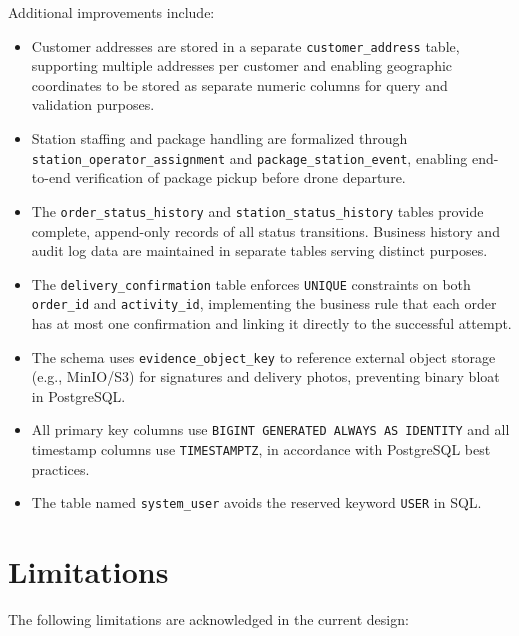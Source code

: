 Additional improvements include:

\begin{itemize}
    \item Customer addresses are stored in a separate \texttt{customer\_address} table, supporting multiple addresses per customer and enabling geographic coordinates to be stored as separate numeric columns for query and validation purposes.
    \item Station staffing and package handling are formalized through \texttt{station\_operator\_assignment} and \texttt{package\_station\_event}, enabling end-to-end verification of package pickup before drone departure.
    \item The \texttt{order\_status\_history} and \texttt{station\_status\_history} tables provide complete, append-only records of all status transitions. Business history and audit log data are maintained in separate tables serving distinct purposes.
    \item The \texttt{delivery\_confirmation} table enforces \texttt{UNIQUE} constraints on both \texttt{order\_id} and \texttt{activity\_id}, implementing the business rule that each order has at most one confirmation and linking it directly to the successful attempt.
    \item The schema uses \texttt{evidence\_object\_key} to reference external object storage (e.g., MinIO/S3) for signatures and delivery photos, preventing binary bloat in PostgreSQL.
    \item All primary key columns use \texttt{BIGINT GENERATED ALWAYS AS IDENTITY} and all timestamp columns use \texttt{TIMESTAMPTZ}, in accordance with PostgreSQL best practices.
    \item The table named \texttt{system\_user} avoids the reserved keyword \texttt{USER} in SQL.
\end{itemize}

\section{Limitations}\label{s:limitations}

The following limitations are acknowledged in the current design:


